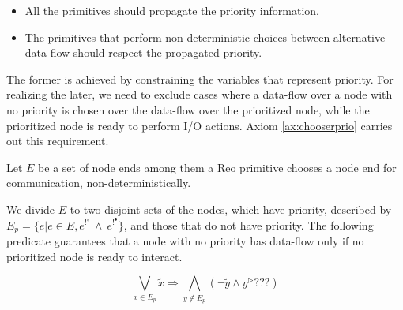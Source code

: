 \begin{itemize}
\item All the primitives should propagate the priority information,
\item The primitives that perform non-deterministic choices between alternative data-flow should respect the propagated priority.
\end{itemize}

The former is achieved by constraining the variables that represent priority. For realizing the later, we need to exclude cases where a data-flow over a node with no priority is chosen over the data-flow over the prioritized node, while the prioritized node is ready to perform I/O actions. Axiom \ref{ax:chooserprio} carries out this requirement.

\begin{axiom}\label{ax:chooserprio}
Let $E$ be a set of node ends among them a Reo primitive chooses a node end for communication, non-deterministically.

We divide $E$ to two disjoint sets of the nodes, which have priority, described by $E_p=\{e | e \in E, e^{!^\circ}\ \wedge\ e^{!^\bullet}\}$, and those that do not have priority. The following predicate guarantees that a node with no priority has data-flow only if no prioritized node is ready to interact.

$$\bigvee_{x \in E_p} \tilde{x} \Rightarrow \bigwedge_{y \notin E_p} (\neg \tilde{y} \wedge y^\triangleright???) $$
\end{axiom}

